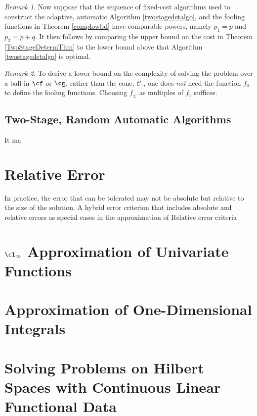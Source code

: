 \documentclass[final]{elsarticle}
\newcommand{\cc}{\mathcal{C}}
\theoremstyle{definition}
\theoremstyle{remark}
\newtheorem{rem}{Remark}
\begin{document}
\begin{rem} Now suppose that the sequence of fixed-cost algorithms used to construct the adaptive, automatic Algorithm \ref{twostagedetalgo}, and the fooling functions in Theorem \ref{complowbd} have comparable powers, namely $p_1=p$ and $p_2=p+q$.  It then follows by comparing the upper bound on the cost in Theorem \ref{TwoStageDetermThm} to the lower bound above that Algorithm \ref{twostagedetalgo} is optimal. 
\end{rem}

\begin{rem} To derive a lower bound on the complexity of solving the problem over a ball in $\cf$ or $\cg$, rather than the cone, $\cc_{\tau}$, one does \emph{not} need the function $f_0$ to define the fooling functions.  Choosing $f_{\pm}$ as multiples of $f_1$ suffices.  
\end{rem}

\subsection{Two-Stage, Random Automatic Algorithms}
It ma


\section{Relative Error} \label{relerrsec} In practice, the error that can be tolerated may not be absolute but relative to the size of the solution.  A hybrid error criterion that includes absolute and relative errors as special cases  in the approximation of Relative error criteria

\section{$\cl_{\infty}$ Approximation of Univariate Functions} \label{approxsec}



\section{Approximation of One-Dimensional Integrals} \label{integsec}




\section{Solving Problems on Hilbert Spaces with Continuous Linear Functional Data}
\end{document}
